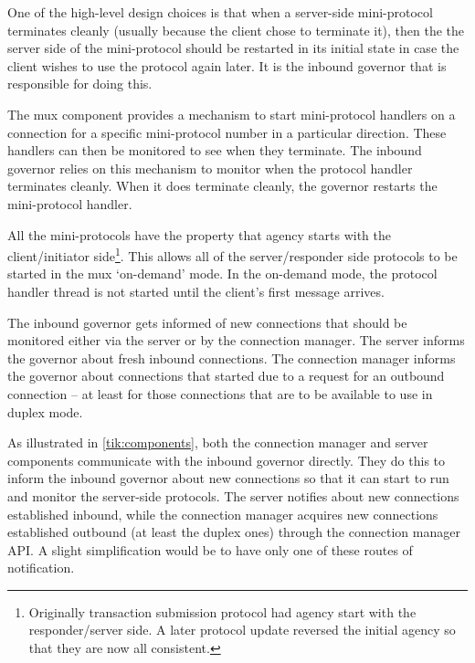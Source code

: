 One of the high-level design choices is that when a server-side mini-protocol
terminates cleanly (usually because the client chose to terminate it), then the
the server side of the mini-protocol should be restarted in its initial state in
case the client wishes to use the protocol again later. It is the inbound
governor that is responsible for doing this.

The mux component provides a mechanism to start mini-protocol handlers on a
connection for a specific mini-protocol number in a particular direction. These
handlers can then be monitored to see when they terminate. The inbound governor
relies on this mechanism to monitor when the protocol handler terminates
cleanly. When it does terminate cleanly, the governor restarts the mini-protocol
handler.

All the mini-protocols have the property that agency starts with the
client/initiator side\footnote{Originally transaction submission protocol had
agency start with the responder/server side. A later protocol update reversed
the initial agency so that they are now all consistent.}. This allows all of
the server/responder side protocols to be started in the mux `on-demand' mode.
In the on-demand mode, the protocol handler thread is not started until the
client's first message arrives. 

The inbound governor gets informed of new connections that should be monitored
either via the server or by the connection manager. The server informs the
governor about fresh inbound connections. The connection manager informs the
governor about connections that started due to a request for an outbound
connection -- at least for those connections that are to be available to use in
duplex mode.

As illustrated in \cref{tik:components}, both the connection manager and server
components communicate with the inbound governor directly. They do this to
inform the inbound governor about new connections so that it can start to run
and monitor the server-side protocols. The server notifies about new connections
established inbound, while the connection manager acquires new connections
established outbound (at least the duplex ones) through the connection manager API.
A slight simplification would be to have only one of these routes of
notification.


